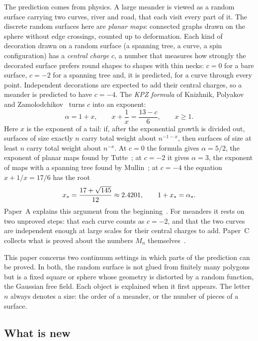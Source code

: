 The prediction comes from physics. A large meander is viewed as a random surface carrying two
curves, river and road, that each visit every part of it. The discrete random surfaces here are
\emph{planar maps}: connected graphs drawn on the sphere without edge crossings, counted up to
deformation. Each kind of decoration drawn on a random surface (a spanning tree, a curve, a spin
configuration) has a \emph{central charge} $c$, a number that measures how strongly the decorated
surface prefers round shapes to shapes with thin necks: $c=0$ for a bare surface, $c=-2$ for a
spanning tree and, it is predicted, for a curve through every point. Independent decorations are
expected to add their central charges, so a meander is predicted to have $c=-4$. The
\emph{KPZ formula} of Knizhnik, Polyakov and Zamolodchikov~\cite{KPZ} turns $c$ into an exponent:
\begin{equation}\label{eq:kpz}
\alpha=1+x,\qquad x+\frac1x=\frac{13-c}{6},\qquad x\ge1 .
\end{equation}
Here $x$ is the exponent of a tail: if, after the exponential growth is divided out, surfaces of
size exactly $n$ carry total weight about $n^{-1-x}$, then surfaces of size at least $n$ carry total
weight about $n^{-x}$. At $c=0$ the
formula gives $\alpha=5/2$, the exponent of planar maps found by Tutte~\cite{Tutte}; at $c=-2$ it
gives $\alpha=3$, the exponent of maps with a spanning tree found by Mullin~\cite{Mullin}; at $c=-4$
the equation $x+1/x=17/6$ has the root
\[
x_*=\frac{17+\sqrt{145}}{12}\approx2.4201,\qquad 1+x_*=\alpha_* .
\]
Paper~A explains this argument from the beginning~\cite{PaperA}. For meanders it rests on two
unproved steps: that each curve counts as $c=-2$, and that the two curves are independent enough
at large scales for their central charges to add. Paper~C collects what is proved about the numbers
$M_n$ themselves~\cite{PaperC}.

This paper concerns two continuum settings in which parts of the prediction can be proved. In
both, the random surface is not glued from finitely many polygons but is a fixed square or sphere
whose geometry is distorted by a random function, the Gaussian free field. Each object is explained
when it first appears. The letter $n$ always denotes a size: the order of a meander, or the number
of pieces of a surface.

\subsection{What is new}

